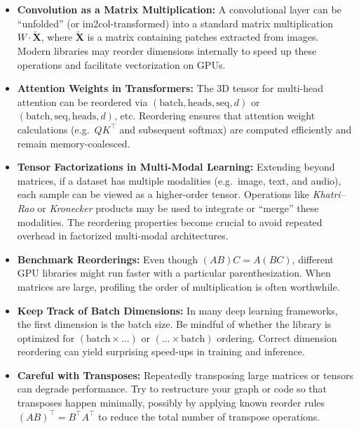 \begin{itemize}
    \item \textbf{Convolution as a Matrix Multiplication:} 
          A convolutional layer can be “unfolded” (or im2col-transformed) into a standard 
          matrix multiplication $W \cdot \tilde{\mathbf{X}}$, 
          where $\tilde{\mathbf{X}}$ is a matrix containing patches extracted from images. 
          Modern libraries may reorder dimensions internally to speed up these operations 
          and facilitate vectorization on GPUs.

    \item \textbf{Attention Weights in Transformers:} 
          The 3D tensor for multi-head attention can be reordered via $(\text{batch}, \text{heads}, \text{seq}, d)$ 
          or $(\text{batch}, \text{seq}, \text{heads}, d)$, etc. 
          Reordering ensures that attention weight calculations (e.g.\ $QK^\top$ and subsequent 
          softmax) are computed efficiently and remain memory-coalesced.

    \item \textbf{Tensor Factorizations in Multi-Modal Learning:} 
          Extending beyond matrices, if a dataset has multiple modalities (e.g.\ image, text, and audio), 
          each sample can be viewed as a higher-order tensor. 
          Operations like \emph{Khatri--Rao} or \emph{Kronecker} products may be used 
          to integrate or “merge” these modalities. 
          The reordering properties become crucial to avoid repeated overhead 
          in factorized multi-modal architectures.
    \item \textbf{Benchmark Reorderings:} 
          Even though $(AB)C = A(BC)$, different GPU libraries might run faster with a particular parenthesization. 
          When matrices are large, profiling the order of multiplication is often worthwhile.

    \item \textbf{Keep Track of Batch Dimensions:} 
          In many deep learning frameworks, the first dimension is the batch size. 
          Be mindful of whether the library is optimized for $(\text{batch} \times \dots)$ or 
          $(\dots \times \text{batch})$ ordering. 
          Correct dimension reordering can yield surprising speed-ups in training and inference.

    \item \textbf{Careful with Transposes:} 
          Repeatedly transposing large matrices or tensors can degrade performance. 
          Try to restructure your graph or code so that transposes happen minimally, 
          possibly by applying known reorder rules $(AB)^\top = B^\top A^\top$ 
          to reduce the total number of transpose operations.


\end{itemize}

